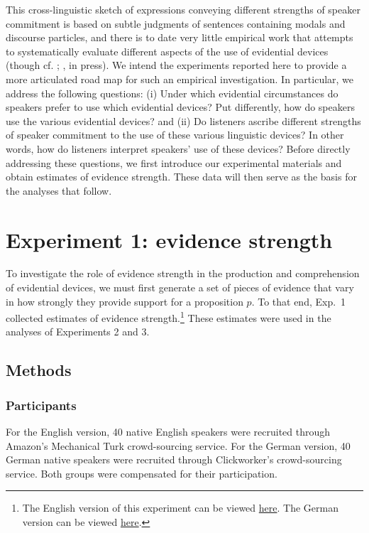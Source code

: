 \documentclass[11pt]{article}
\begin{document}
This cross-linguistic sketch of expressions conveying different strengths of speaker commitment is based on subtle judgments of sentences containing modals and discourse particles, and there is to date very little empirical work that attempts to systematically evaluate different aspects of the use of evidential devices (though cf. \citealp{KnobeYalcin2014}; \citeauthor{LassiterInpress}, in press). We intend the experiments reported here to provide a more articulated road map for such an empirical investigation. In particular, we address the following questions: (i) Under which evidential circumstances do speakers prefer to use which evidential devices?  Put differently, how do speakers use the various evidential devices? and (ii) Do listeners ascribe different strengths of speaker commitment to the use of these various linguistic devices? In other words, how do listeners interpret speakers' use of these devices? Before directly addressing these questions, we first introduce our experimental materials and obtain estimates of evidence strength. These data will then serve as the basis for the analyses that follow.

\section{Experiment 1: evidence strength}

To investigate the role of evidence strength in the production and comprehension of evidential devices, we must first generate a set of pieces of evidence that vary in how strongly they provide support for a proposition $p$. To that end, Exp.~1 collected estimates of evidence strength.\footnote{The English version of this experiment can be viewed \href{https://web.stanford.edu/~justinek/modals_exp/evidence.html}{here}. The German version can be viewed \href{http://web.stanford.edu/~jdegen/cgi-bin/4_dp_priors_evidencestrength/evidence.html}{here}.} These estimates were used in the analyses of Experiments 2 and 3.

\subsection{Methods}

\subsubsection{Participants}

For the English version, 40 native English speakers were recruited through Amazon's Mechanical Turk crowd-sourcing service. For the German version, 40 German native speakers were recruited through Clickworker's crowd-sourcing service. Both groups were compensated for their participation.
\end{document}
